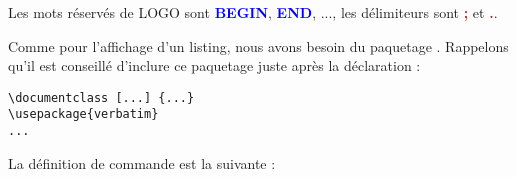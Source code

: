 Les mots réservés de LOGO sont \colorbox{gray!6}{\ttfamily\textcolor{blue}{\bf BEGIN}}, \colorbox{gray!6}{\ttfamily\textcolor{blue}{\bf END}}, ..., les délimiteurs sont \colorbox{gray!6}{\ttfamily\textcolor{brown}{\bf ;}} et \colorbox{gray!6}{\ttfamily\textcolor{brown}{\bf .}}.

Comme pour l'affichage d'un listing, nous avons besoin du paquetage . Rappelons qu'il est conseillé d'inclure ce paquetage juste après la déclaration  :

{\linespread{1}
\begin{verbatim}
\documentclass [...] {...}
\usepackage{verbatim}
...
\end{verbatim}
}

La définition de commande  est la suivante :






